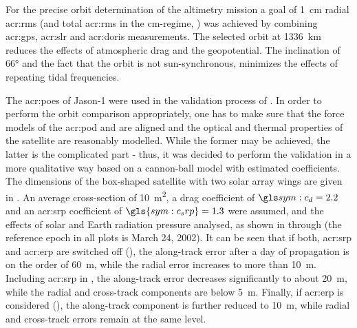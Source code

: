
For the precise orbit determination of the altimetry mission a goal of \SI{1}{\centi\metre} radial \gls{acr:rms} (and total \gls{acr:rms} in the cm-regime,  
\cite{luthcke2003}) was achieved by combining \gls{acr:gps}, \gls{acr:slr} and \gls{acr:doris} measurements. The selected orbit at \SI{1336}{\kilo\metre} reduces the 
effects of atmospheric drag and the geopotential. The inclination of \ang{66;;} and the fact that the orbit is not sun-synchronous, minimizes the effects of repeating tidal 
frequencies.

The \glspl{acr:poe} of Jason-1 were used in the validation process of \neptune. In order to perform the orbit comparison appropriately, one has to make sure that the force 
models of the \gls{acr:pod} and \neptune are aligned and the optical and thermal 
properties of the satellite are reasonably modelled. While the former may be achieved, the latter is the complicated part - thus, it was decided to perform the validation 
in a more qualitative way based on a cannon-ball model with estimated coefficients. The dimensions of the box-shaped satellite with two solar array wings are given in 
. An average cross-section of \SI{10}{\metre\squared}, a drag coefficient of $\cd=2.2$ and an \gls{acr:srp} coefficient of $\gls{sym:c_srp}=1.3$
were assumed, and the effects of solar and Earth radiation pressure analysed, as shown in  through  (the reference epoch 
in all plots is March 24, 2002). It can be seen that if both, \gls{acr:srp} and \gls{acr:erp} are switched off (), the along-track error 
after a day of propagation is on the order of \SI{60}{\metre}, while the radial error increases to more than \SI{10}{\metre}. Including \gls{acr:srp} in 
, the along-track error decreases significantly to about \SI{20}{\metre}, while the radial and cross-track components are below \SI{5}{\metre}. 
Finally, if \gls{acr:erp} is considered (), the along-track component is further reduced to \SI{10}{\metre}, while radial and cross-track errors 
remain at the same level.
